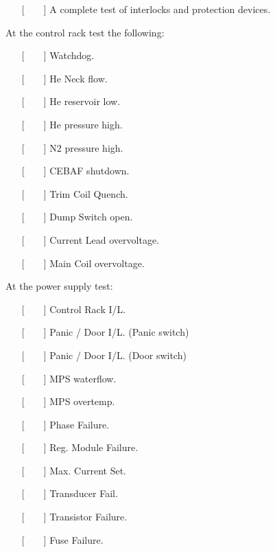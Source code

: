 \begin{itemize}
\item[{[~~~~]}] {A complete test of interlocks and protection devices.~\cite{bi:oxf2,bi:danf}}
\end{itemize}

At the control rack test the following:

\begin{itemize}
\item[{[~~~~]}]{Watchdog.}
\item[{[~~~~]}]{He Neck flow.}
\item[{[~~~~]}]{He reservoir low.}
\item[{[~~~~]}]{He pressure high.}
\item[{[~~~~]}]{N2 pressure high.}
\item[{[~~~~]}]{CEBAF shutdown.}
\item[{[~~~~]}]{Trim Coil Quench.}
\item[{[~~~~]}]{Dump Switch open.}
\item[{[~~~~]}]{Current Lead overvoltage.}
\item[{[~~~~]}]{Main Coil overvoltage.}
\end{itemize}


At the power supply test:

\begin{itemize}
\item[{[~~~~]}]{Control Rack I/L.}
\item[{[~~~~]}]{Panic / Door I/L. (Panic switch)}
\item[{[~~~~]}]{Panic / Door I/L. (Door switch)}
\item[{[~~~~]}]{MPS waterflow.}
\item[{[~~~~]}]{MPS overtemp.}
\item[{[~~~~]}]{Phase Failure.}
\item[{[~~~~]}]{Reg. Module Failure.}
\item[{[~~~~]}]{Max. Current Set.}
\item[{[~~~~]}]{Transducer Fail.}
\item[{[~~~~]}]{Transistor Failure.}
\item[{[~~~~]}]{Fuse Failure.}
\end{itemize}

